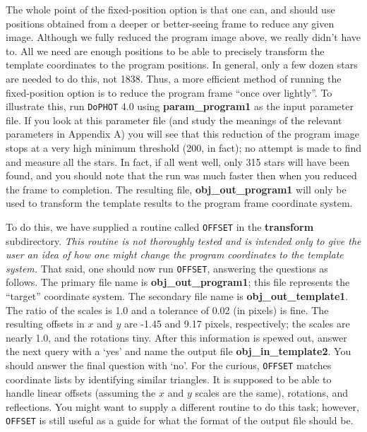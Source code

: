 The whole point of the fixed-position option is that one can, and should
use positions obtained from a deeper or better-seeing frame to reduce 
any given image.  Although we fully reduced the program image above, we
really didn't have to.  All we need are enough positions to be able to
precisely transform the template coordinates to the program positions.  
In general, only a few dozen stars are needed to do this, not 1838.  Thus,
a more efficient method of running the fixed-position option is to reduce
the program frame ``once over lightly''.  To illustrate this, run 
{\tt DoPHOT} 4.0 using {\bf param\_program1} as the input parameter file.  If you
look at this parameter file (and study the meanings of the relevant 
parameters in Appendix A) you will see that this reduction of the program
image stops at a very high minimum threshold (200, in fact); 
no attempt is made to find
and measure all the stars.  In fact, if all went well, only 315 stars
will have been found, and you should note that the run was much faster then
when you reduced the frame to completion.  The resulting file, 
{\bf obj\_out\_program1} will only be used to transform the template results
to the program frame coordinate system.

To do this, we have supplied a routine called {\tt OFFSET} in the 
{\bf transform} subdirectory.  {\it This routine is not thoroughly tested
and is intended only to give the user an idea of how one might change
the program coordinates to the template system.}  That said, one should now
run {\tt OFFSET}, answering the questions as follows.
The primary file name is {\bf obj\_out\_program1};  this file represents the
``target'' coordinate system.  The secondary file name is 
{\bf obj\_out\_template1}.  The ratio of the scales is 1.0 and a tolerance
of 0.02 (in pixels) is fine.   The resulting offsets in $x$ and $y$ are -1.45 and
9.17 pixels, respectively;  the scales are nearly 1.0, and the rotations
tiny.  After this information is spewed out, answer the next
query with a `yes' and name the 
output file {\bf obj\_in\_template2}.  You should answer the final question
with `no'.   
For the curious, {\tt OFFSET} matches coordinate lists 
by identifying similar triangles.  It is supposed to be able to handle 
linear offsets (assuming the $x$ and $y$ scales are the same), rotations,
and reflections.   You might want to supply a different routine to do this
task;  however, {\tt OFFSET} is still useful as a guide for what the 
format of the output file should be.

